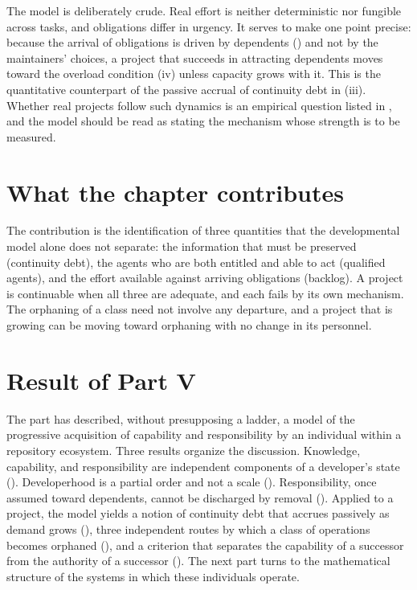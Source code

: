 \documentclass[11pt,twoside,openright]{book}
\theoremstyle{plain}
\theoremstyle{definition}
\theoremstyle{remark}
\begin{document}
The model is deliberately crude. Real effort is neither deterministic nor fungible across tasks, and obligations differ in urgency. It serves to make one point precise: because the arrival of obligations is driven by dependents () and not by the maintainers' choices, a project that succeeds in attracting dependents moves toward the overload condition (iv) unless capacity grows with it. This is the quantitative counterpart of the passive accrual of continuity debt in (iii). Whether real projects follow such dynamics is an empirical question listed in , and the model should be read as stating the mechanism whose strength is to be measured.

\section{What the chapter contributes}

The contribution is the identification of three quantities that the developmental model alone does not separate: the information that must be preserved (continuity debt), the agents who are both entitled and able to act (qualified agents), and the effort available against arriving obligations (backlog). A project is continuable when all three are adequate, and each fails by its own mechanism. The orphaning of a class need not involve any departure, and a project that is growing can be moving toward orphaning with no change in its personnel.

\section{Result of Part V}

The part has described, without presupposing a ladder, a model of the progressive acquisition of capability and responsibility by an individual within a repository ecosystem. Three results organize the discussion. Knowledge, capability, and responsibility are independent components of a developer's state (). Developerhood is a partial order and not a scale (). Responsibility, once assumed toward dependents, cannot be discharged by removal (). Applied to a project, the model yields a notion of continuity debt that accrues passively as demand grows (), three independent routes by which a class of operations becomes orphaned (), and a criterion that separates the capability of a successor from the authority of a successor (). The next part turns to the mathematical structure of the systems in which these individuals operate.
\end{document}
